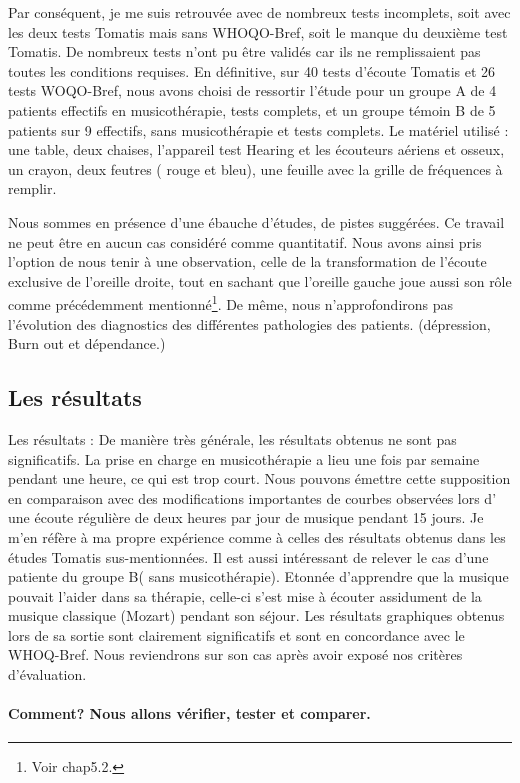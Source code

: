Par conséquent, je me suis retrouvée avec de nombreux tests
incomplets, soit avec les deux tests Tomatis mais sans WHOQO-Bref,
soit le manque du deuxième test Tomatis. De nombreux tests n'ont pu
être validés car ils ne remplissaient pas toutes les conditions
requises.  En définitive, sur 40 tests d'écoute Tomatis et 26 tests
WOQO-Bref, nous avons choisi de ressortir l'étude pour un groupe A de
4 patients effectifs en musicothérapie, tests complets, et un groupe
témoin B de 5 patients sur 9 effectifs, sans musicothérapie et tests
complets.  Le matériel utilisé : une table, deux chaises, l'appareil
test Hearing et les écouteurs aériens et osseux, un crayon, deux
feutres ( rouge et bleu), une feuille avec la grille de fréquences à
remplir.
 
Nous sommes en présence d'une ébauche d'études, de pistes
suggérées. Ce travail ne peut être en aucun cas considéré comme
quantitatif.  Nous avons ainsi pris l'option de nous tenir à une
observation, celle de la transformation de l'écoute exclusive de
l'oreille droite, tout en sachant que l'oreille gauche joue aussi son
rôle comme précédemment mentionné\footnote{Voir chap5.2.}.  De même,
nous n'approfondirons pas l'évolution des diagnostics des différentes
pathologies des patients.  (dépression, Burn out et dépendance.)
  
\subsection{Les résultats}  
  Les résultats : De manière très générale, les résultats obtenus ne
  sont pas significatifs.  La prise en charge en musicothérapie a lieu
  une fois par semaine pendant une heure, ce qui est trop court. Nous
  pouvons émettre cette supposition en comparaison avec des
  modifications importantes de courbes observées lors d' une écoute
  régulière de deux heures par jour de musique pendant 15 jours. Je
  m'en réfère à ma propre expérience comme à celles des résultats
  obtenus dans les études Tomatis sus-mentionnées.  Il est aussi
  intéressant de relever le cas d'une patiente du groupe B( sans
  musicothérapie). Etonnée d'apprendre que la musique pouvait l'aider
  dans sa thérapie, celle-ci s'est mise à écouter assidument de la
  musique classique (Mozart) pendant son séjour. Les résultats
  graphiques obtenus lors de sa sortie sont clairement significatifs
  et sont en concordance avec le WHOQ-Bref.  Nous reviendrons sur son
  cas après avoir exposé nos critères d'évaluation.

  \paragraph{Comment? Nous allons vérifier, tester et comparer.}
  
